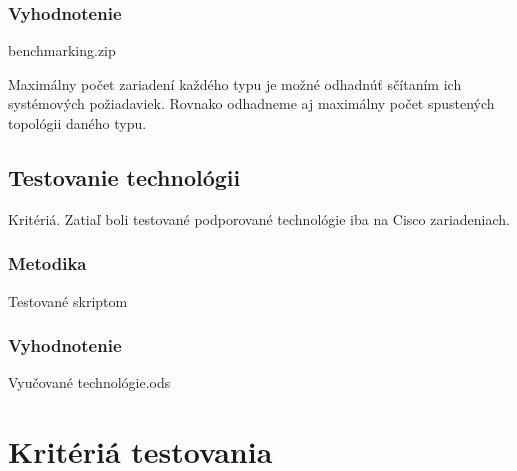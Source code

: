 \subsubsection{Vyhodnotenie}

benchmarking.zip

Maximálny počet zariadení každého typu je možné odhadnúť sčítaním ich systémových požiadaviek. Rovnako odhadneme aj maximálny počet spustených topológii daného typu.

\subsection{Testovanie technológii}

Kritériá.
Zatiaľ boli testované podporované technológie iba na Cisco zariadeniach.

\subsubsection{Metodika}

Testované skriptom

\subsubsection{Vyhodnotenie}

Vyučované technológie.ods

\section{Kritériá testovania}